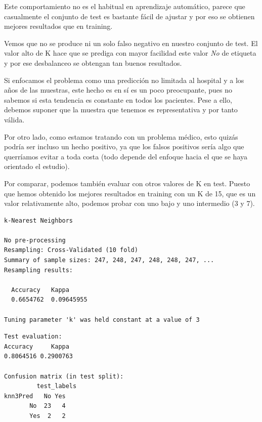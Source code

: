 Este comportamiento no es el habitual en aprendizaje automático, parece que casualmente el conjunto de test es bastante fácil de ajustar y por eso se obtienen mejores resultados que en training.

\vspace{\baselineskip}

Vemos que no se produce ni un solo falso negativo en nuestro conjunto de test. El valor alto de K hace que se prediga con mayor facilidad este valor \textit{No} de etiqueta y por ese desbalanceo se obtengan tan buenos resultados.

\vspace{\baselineskip}

Si enfocamos el problema como una predicción no limitada al hospital y a los años de las muestras, este hecho es en sí es un poco preocupante, pues no sabemos si esta tendencia es constante en todos los pacientes. Pese a ello, debemos suponer que la muestra que tenemos es representativa y por tanto válida.

Por otro lado, como estamos tratando con un problema médico, esto quizás podría ser incluso un hecho positivo, ya que los falsos positivos sería algo que querríamos evitar a toda costa (todo depende del enfoque hacia el que se haya orientado el estudio).

\newpage

Por comparar, podemos también evaluar con otros valores de K en test. Puesto que hemos obtenido los mejores resultados en training con un K de 15, que es un valor relativamente alto, podemos probar con uno bajo y uno intermedio (3 y 7).

\begin{verbatim}
k-Nearest Neighbors

No pre-processing
Resampling: Cross-Validated (10 fold) 
Summary of sample sizes: 247, 248, 247, 248, 248, 247, ... 
Resampling results:

  Accuracy   Kappa     
  0.6654762  0.09645955

Tuning parameter 'k' was held constant at a value of 3
\end{verbatim}

\begin{verbatim}
Test evaluation:
Accuracy     Kappa 
0.8064516 0.2900763 

Confusion matrix (in test split):
         test_labels
knn3Pred   No Yes
       No  23   4
       Yes  2   2
\end{verbatim}

